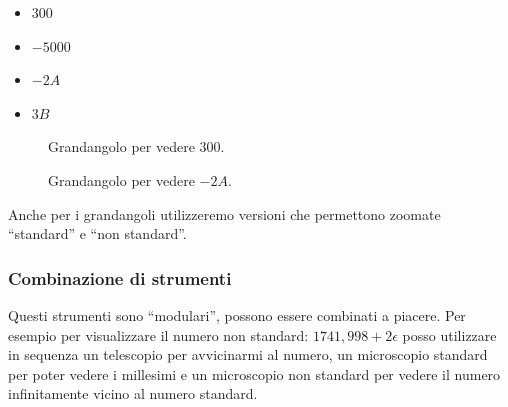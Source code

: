 \begin{multicols}{4}
\begin{itemize}[nosep]
 \item $300$
 \item $-5000$
 \item $-2A$
 \item $3B$
\end{itemize}
\end{multicols}
\vspace{-5mm}
\begin{figure}[h]
\begin{inaccessibleblock}

\begin{minipage}{.48\linewidth}
 \begin{center}
\grandangoloa
 \end{center}
\caption{Grandangolo per vedere \(300\).} \label{fig:grandangoloa}
\end{minipage}
\hfill
\begin{minipage}{.48\linewidth}
 \begin{center}
\grandangolob
 \end{center}
\caption{Grandangolo per vedere \(-2A\).} \label{fig:grandangolob}
\end{minipage}

\end{inaccessibleblock}
\end{figure}

Anche per i grandangoli utilizzeremo versioni che permettono zoomate 
``standard'' e ``non standard''.

\begin{inaccessibleblock}
\begin{minipage}{.38\linewidth}
\subsubsection{Combinazione di strumenti}
\label{subsec:insnum_combinazione}

Questi strumenti sono ``modulari'', possono essere combinati a piacere. 
Per esempio per visualizzare il numero non standard: 
\(1741,998 +2\epsilon\) posso utilizzare in sequenza un telescopio per 
avvicinarmi al numero, un microscopio standard per poter vedere i 
millesimi e un microscopio non standard per vedere il numero infinitamente 
vicino al numero standard.
\end{minipage}
\hfill
\begin{minipage}{.58\linewidth}
 \begin{center}
\combinazione
 \end{center}
\end{minipage}
\end{inaccessibleblock}

